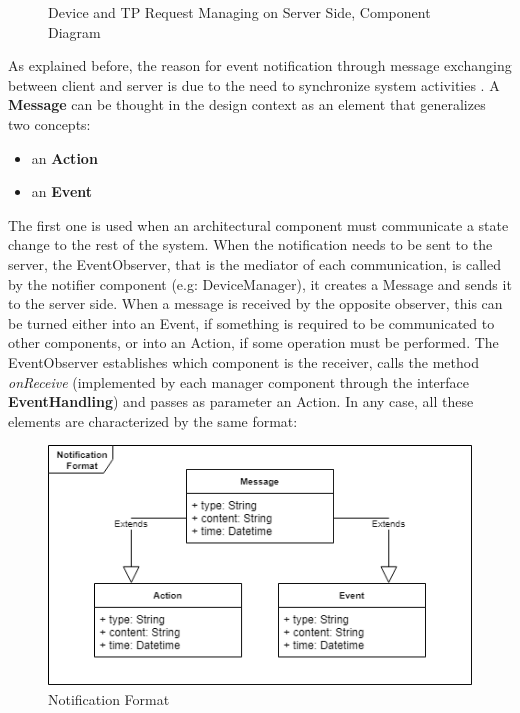 \begin{flushleft}
{\begin{figure}[H]
	\caption{Device and TP Request Managing on Server Side, Component Diagram}
	\label{Figure 6}
\end{figure}
}
\newpage
As explained before, the reason for event notification through message exchanging between client and server is due to the need to synchronize system activities . A \textbf{Message} can be thought in the design context as an element that generalizes two concepts:
\begin{itemize}
	\item an \textbf{Action}
	\item an \textbf{Event}
\end{itemize} 
The first one is used when an architectural component must communicate a state change to the rest of the system. When the notification needs to be sent to the server, the EventObserver, that is the mediator of each communication, is called by the notifier component (e.g: DeviceManager), it creates a Message and sends it to the server side. When a message is received by the opposite observer, this can be turned either into an Event, if something is required to be communicated to other components, or into an Action, if some operation must be performed. The EventObserver establishes which component is the receiver, calls the method \textit{onReceive} (implemented by each manager component through the interface \textbf{EventHandling}) and passes as parameter an Action. In any case, all these elements are characterized by the same format:

\begin{figure}[H]
	\centering
	\includegraphics[scale=0.5]{images/uml/message_format.png}
	\caption{Notification Format}
	\label{Figure 7}
\end{figure}


\end{flushleft}
